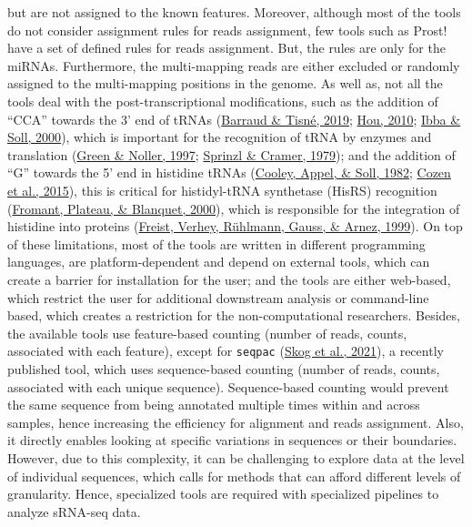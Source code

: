 \documentclass[12pt,twoside]{reedthesis}
\begin{document}
but are not assigned to the known features. Moreover, although most of
the tools do not consider assignment rules for reads assignment, few
tools such as Prost! have a set of defined rules for reads assignment.
But, the rules are only for the miRNAs. Furthermore, the multi-mapping
reads are either excluded or randomly assigned to the multi-mapping
positions in the genome. As well as, not all the tools deal with the
post-transcriptional modifications, such as the addition of ``CCA''
towards the 3' end of tRNAs (\protect\hyperlink{ref-barraud2019}{Barraud \& Tisné, 2019}; \protect\hyperlink{ref-hou2010}{Hou, 2010}; \protect\hyperlink{ref-ibba2000}{Ibba \& Soll, 2000}), which
is important for the recognition of tRNA by enzymes and translation
(\protect\hyperlink{ref-green1997}{Green \& Noller, 1997}; \protect\hyperlink{ref-sprinzl1979}{Sprinzl \& Cramer, 1979}); and the addition of ``G'' towards the 5' end
in histidine tRNAs (\protect\hyperlink{ref-cooley1982}{Cooley, Appel, \& Soll, 1982}; \protect\hyperlink{ref-cozen2015}{Cozen et al., 2015}), this is critical for
histidyl-tRNA synthetase (HisRS) recognition (\protect\hyperlink{ref-fromant2000}{Fromant, Plateau, \& Blanquet, 2000}), which is
responsible for the integration of histidine into proteins
(\protect\hyperlink{ref-freist1999}{Freist, Verhey, Rühlmann, Gauss, \& Arnez, 1999}). On top of these limitations, most of the tools are
written in different programming languages, are platform-dependent and
depend on external tools, which can create a barrier for installation
for the user; and the tools are either web-based, which restrict the
user for additional downstream analysis or command-line based, which
creates a restriction for the non-computational researchers. Besides,
the available tools use feature-based counting (number of reads, counts,
associated with each feature), except for \texttt{seqpac} (\protect\hyperlink{ref-skog2021}{Skog et al., 2021}), a recently
published tool, which uses sequence-based counting (number of reads,
counts, associated with each unique sequence). Sequence-based counting
would prevent the same sequence from being annotated multiple times
within and across samples, hence increasing the efficiency for alignment
and reads assignment. Also, it directly enables looking at specific
variations in sequences or their boundaries. However, due to this
complexity, it can be challenging to explore data at the level of
individual sequences, which calls for methods that can afford different
levels of granularity. Hence, specialized tools are required with
specialized pipelines to analyze sRNA-seq data.
\end{document}
